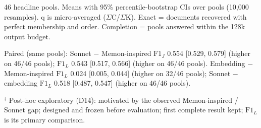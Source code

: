 \begin{strip}
\centering
\footnotesize
\setlength{\tabcolsep}{3pt}
\label{tab:headline}
\ifdim\wd0>\textwidth\resizebox{\textwidth}{!}{\usebox0}\else\usebox0\fi
\end{strip}
\begingroup\footnotesize\setlength{\parindent}{0pt}
\setlength{\parskip}{1pt plus 1pt}
46 headline pools. Means with 95\% percentile-bootstrap CIs over pools (10,000 resamples). q is micro-averaged ($\Sigma$C/$\Sigma$K). Exact = documents recovered with perfect membership and order. Completion = pools answered within the 128k output budget.\par
Paired (same pools): Sonnet $-$ Memon-inspired $\mathrm{F1}_{J}$ 0.554 [0.529, 0.579] (higher on 46/46 pools); $\mathrm{F1}_{L}$ 0.543 [0.517, 0.566] (higher on 46/46 pools). Embedding $-$ Memon-inspired $\mathrm{F1}_{L}$ 0.024 [0.005, 0.044] (higher on 32/46 pools); Sonnet $-$ embedding $\mathrm{F1}_{L}$ 0.518 [0.487, 0.547] (higher on 46/46 pools).\par
$^\dagger$ Post-hoc exploratory (D14): motivated by the observed Memon-inspired / Sonnet gap; designed and frozen before evaluation; first complete result kept; $\mathrm{F1}_{L}$ is its primary comparison.\par
\endgroup
\par\addvspace{\intextsep}
